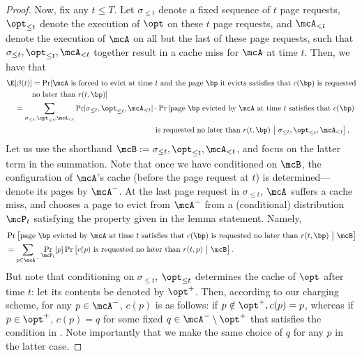\documentclass[11pt]{article}
\begin{document}
\begin{proof}
    Now, fix any $t \le T$. Let $\sigma_{\le t}$ denote a fixed sequence of $t$ page requests, $\opt_{\le t}$ denote the execution of $\opt$ on these $t$ page requests, and $\mcA_{<t}$ denote the execution of $\mcA$ on all but the last of these page requests, such that $\sigma_{\le t}, \opt_{\le t}, \mcA_{< t}$ together result in a cache miss for $\mcA$ at time $t$. Then, we have that
    \begin{align*}
        \E[\beta(t)] &= \Pr[\text{$\mcA$ is forced to evict at time $t$ and the page $\bp$ it evicts satisfies that $c(\bp)$ is requested} \nonumber \\
        &\text{no later than $r(t,\bp)$}] \\
        &\hspace{-0.8cm}= \sum_{\sigma_{\le t}, \opt_{\le t}, \mcA_{<t}} \Pr[\sigma_{\le t}, \opt_{\le t}, \mcA_{<t}] \cdot \Pr\left[\text{page $\bp$ evicted by $\mcA$ at time $t$ satisfies that $c(\bp)$} \right. \\ &\qquad\qquad\qquad\qquad\qquad\qquad\qquad\qquad
        \left.\text{is requested no later than $r(t,\bp)$}\ \big|\ \sigma_{\le t}, \opt_{\le t}, \mcA_{<t}\right],
    \end{align*}
    Let us use the shorthand $\mcB:=\sigma_{\le t}, \opt_{\le t}, \mcA_{<t}$, and focus on the latter term in the summation.
    Note that once we have conditioned on $\mcB$, the configuration of $\mcA$'s cache (before the page request at $t$) is determined---denote its pages by $\mcA^-$.  At the last page request in $\sigma_{\le t}$, $\mcA$ suffers a cache miss, and chooses a page to evict from $\mcA^-$ from a (conditional) distribution $\mcP_t$ satisfying the property given in the lemma statement. Namely,
    \begin{align*}
        &\Pr\left[\text{page $\bp$ evicted by $\mcA$ at time $t$ satisfies that $c(\bp)$ is requested no later than $r(t,\bp)$}\ \big|\ \mcB\right] \\
        &= \sum_{p \in \mcA^-}\Pr_{\mcP_t}[p] \Pr\left[\text{$c(p)$ is requested no later than $r(t,p)$}\ \big|\ \mcB\right].
    \end{align*}
    But note that conditioning on $\sigma_{\le t}$, $\opt_{\le t}$ determines the cache of $\opt$ after time $t$: let its contents be denoted by $\opt^+$. Then, according to our charging scheme, for any $p \in \mcA^-$, $c(p)$ is as follows: if $p \notin \opt^+, c(p)=p$, whereas if $p \in \opt^+$, $c(p)=q$ for some fixed $q \in \mcA^-\setminus \opt^+$ that satisfies the condition in . Note importantly that we make the same choice of $q$ for any $p$ in the latter case.

\end{proof}
\end{document}
